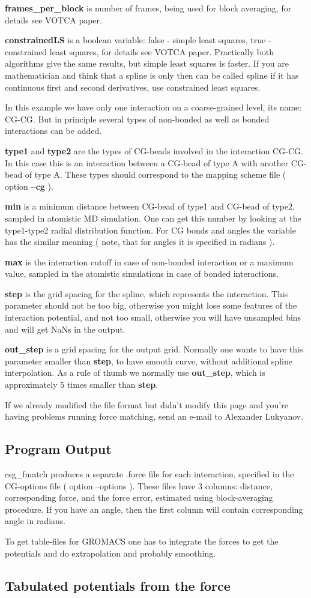 \textbf{frames\_per\_block} is number of frames, being used for block averaging, for details see VOTCA paper.

\textbf{constrainedLS} is a boolean variable: false - simple least squares, true - constrained least squares, for details see VOTCA paper.
Practically both algorithms give the same results, but simple least squares is faster. If you are mathematician and think that a spline is only then can be called spline if it has continuous first and second derivatives, use constrained least squares.

In this example we have only one interaction on a coarse-grained level, its name: CG-CG. But in principle several types of non-bonded as well as bonded interactions can be added. 

\textbf{type1} and \textbf{type2} are the types of CG-beads involved in the interaction CG-CG. In this case this is an interaction between a CG-bead of type A with another CG-bead of type A. These types should correspond to the mapping scheme file ( option \textbf{--cg} ).
 
\textbf{min} is a minimum distance between CG-bead of type1 and CG-bead of type2,  sampled in atomistic MD simulation. One can get this number by looking at the type1-type2 radial distribution function. For CG bonds and angles the variable has the similar meaning ( note, that for angles it is specified in radians ).

\textbf{max} is the interaction cutoff in case of non-bonded interaction or a maximum value, sampled in the atomistic simulations in case of bonded interactions.

\textbf{step} is the grid spacing for the spline, which represents the interaction. This parameter should not be too big, otherwise you might lose some features of the interaction potential, and not too small, otherwise you will have unsampled bins and will get NaNs in the output.

\textbf{out\_step} is a grid spacing for the output grid. Normally one wants to have this parameter smaller than \textbf{step}, 
to have smooth curve, without additional spline interpolation. 
As a rule of thumb we normally use \textbf{out\_step}, which is approximately 5 times smaller than \textbf{step}.

If we already modified the file format but didn't modify this page and you're having problems running force matching, send an e-mail to Alexander Lukyanov.

\subsection{Program Output}
csg\_fmatch produces a separate .force file for each interaction, specified in the CG-options file ( option --options ).
These files have 3 columns: distance, corresponding force, and the force error, estimated using block-averaging procedure.
If you have an angle, then the first column will contain corresponding angle in radians.

To get table-files for GROMACS one has to integrate the forces to get the potentials and do extrapolation and probably smoothing.

\subsection{Tabulated potentials from the force}

